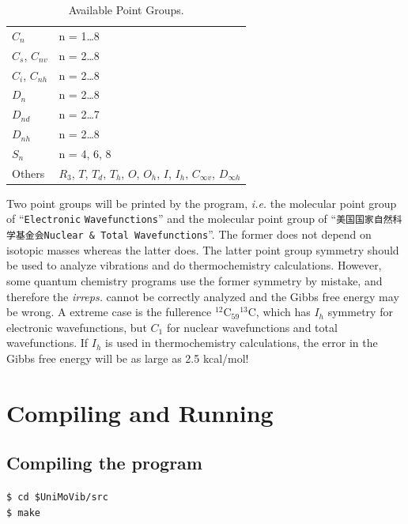 \documentclass[12pt,english]{extarticle}
\begin{document}
\begin{table}[H]
\caption{Available Point Groups.}\label{tab:symm}
\small\centering
\begin{tabular}{ll}
\hline\hline
$C_{n}$           & n = 1\ldots 8 \\
$C_s$, $C_{nv}$   & n = 2\ldots 8 \\
$C_i$, $C_{nh}$   & n = 2\ldots 8 \\
$D_{n}$           & n = 2\ldots 8 \\
$D_{nd}$          & n = 2\ldots 7 \\
$D_{nh}$          & n = 2\ldots 8 \\
$S_{n}$           & n = 4, 6, 8 \\
Others            & $R_3$, $T$, $T_d$, $T_h$, $O$, $O_h$, $I$, $I_h$, $C_{\infty v}$, $D_{\infty h}$ \\
\hline\hline
\end{tabular}
\end{table}

Two point groups will be printed by the program, \emph{i.e.} the molecular point group of ``\verb|Electronic| \verb|Wavefunctions|'' and the molecular point group of ``\verb|美国国家自然科学基金会Nuclear & Total Wavefunctions|''. The former does not depend on isotopic masses whereas the latter does. The latter point group symmetry should be used to analyze vibrations and do thermochemistry calculations. However, some quantum chemistry programs use the former symmetry by mistake, and therefore the \emph{irreps.} cannot be correctly analyzed and the Gibbs free energy may be wrong. A extreme case is the fullerence $^{12}$C$_{59}{}^{13}$C, which has $I_h$ symmetry for electronic wavefunctions, but $C_1$ for nuclear wavefunctions and total wavefunctions. If $I_h$ is used in thermochemistry calculations, the error in the Gibbs free energy will be as large as 2.5 kcal/mol!

\pagebreak{}


\section{Compiling and Running} \label{part:setting}

\subsection{Compiling the program} \label{sec:install}

\verb|$ cd $UniMoVib/src| \\
\verb|$ make |
\end{document}
